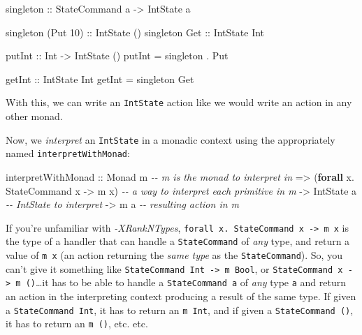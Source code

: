 \documentclass[]{article}
\newenvironment{Shaded}{}{}
\newcommand{\CommentTok}[1]{\textcolor[rgb]{0.38,0.63,0.69}{\textit{#1}}}
\newcommand{\DataTypeTok}[1]{\textcolor[rgb]{0.56,0.13,0.00}{#1}}
\newcommand{\DecValTok}[1]{\textcolor[rgb]{0.25,0.63,0.44}{#1}}
\newcommand{\KeywordTok}[1]{\textcolor[rgb]{0.00,0.44,0.13}{\textbf{#1}}}
\newcommand{\NormalTok}[1]{#1}
\newcommand{\OperatorTok}[1]{\textcolor[rgb]{0.40,0.40,0.40}{#1}}
\newcommand{\OtherTok}[1]{\textcolor[rgb]{0.00,0.44,0.13}{#1}}
\begin{document}
\begin{Shaded}
\begin{Highlighting}[]
\OtherTok{singleton ::} \DataTypeTok{StateCommand}\NormalTok{ a }\OtherTok{{-}\textgreater{}} \DataTypeTok{IntState}\NormalTok{ a}

\NormalTok{singleton (}\DataTypeTok{Put} \DecValTok{10}\NormalTok{)}\OtherTok{ ::} \DataTypeTok{IntState}\NormalTok{ ()}
\NormalTok{singleton }\DataTypeTok{Get}\OtherTok{      ::} \DataTypeTok{IntState} \DataTypeTok{Int}

\OtherTok{putInt ::} \DataTypeTok{Int} \OtherTok{{-}\textgreater{}} \DataTypeTok{IntState}\NormalTok{ ()}
\NormalTok{putInt }\OtherTok{=}\NormalTok{ singleton }\OperatorTok{.} \DataTypeTok{Put}

\OtherTok{getInt ::} \DataTypeTok{IntState} \DataTypeTok{Int}
\NormalTok{getInt }\OtherTok{=}\NormalTok{ singleton }\DataTypeTok{Get}
\end{Highlighting}
\end{Shaded}

With this, we can write an \texttt{IntState} action like we would write an
action in any other monad.

Now, we \emph{interpret} an \texttt{IntState} in a monadic context using the
appropriately named \texttt{interpretWithMonad}:

\begin{Shaded}
\begin{Highlighting}[]
\NormalTok{interpretWithMonad}
\OtherTok{    ::} \DataTypeTok{Monad}\NormalTok{ m                              }\CommentTok{{-}{-} m is the monad to interpret in}
    \OtherTok{=\textgreater{}}\NormalTok{ (}\KeywordTok{forall}\NormalTok{ x}\OperatorTok{.} \DataTypeTok{StateCommand}\NormalTok{ x }\OtherTok{{-}\textgreater{}}\NormalTok{ m x)    }\CommentTok{{-}{-} a way to interpret each primitive in \textquotesingle{}m\textquotesingle{}}
    \OtherTok{{-}\textgreater{}} \DataTypeTok{IntState}\NormalTok{ a                           }\CommentTok{{-}{-} IntState to interpret}
    \OtherTok{{-}\textgreater{}}\NormalTok{ m a                                  }\CommentTok{{-}{-} resulting action in \textquotesingle{}m\textquotesingle{}}
\end{Highlighting}
\end{Shaded}

If you're unfamiliar with \emph{-XRankNTypes},
\texttt{forall\ x.\ StateCommand\ x\ -\textgreater{}\ m\ x} is the type of a
handler that can handle a \texttt{StateCommand} of \emph{any} type, and return a
value of \texttt{m\ x} (an action returning the \emph{same type} as the
\texttt{StateCommand}). So, you can't give it something like
\texttt{StateCommand\ Int\ -\textgreater{}\ m\ Bool}, or
\texttt{StateCommand\ x\ -\textgreater{}\ m\ ()}\ldots it has to be able to
handle a \texttt{StateCommand\ a} of \emph{any} type \texttt{a} and return an
action in the interpreting context producing a result of the same type. If given
a \texttt{StateCommand\ Int}, it has to return an \texttt{m\ Int}, and if given
a \texttt{StateCommand\ ()}, it has to return an \texttt{m\ ()}, etc. etc.
\end{document}
